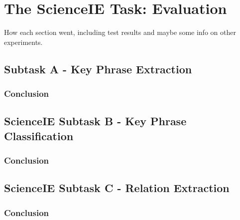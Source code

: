 \chapter{The ScienceIE Task: Evaluation}

How each section went, including test results and maybe some info on other experiments.

\section{Subtask A - Key Phrase Extraction}

\subsection{Conclusion}

\section{ScienceIE Subtask B - Key Phrase Classification}

\subsection{Conclusion}

\section{ScienceIE Subtask C - Relation Extraction}

\subsection{Conclusion}
